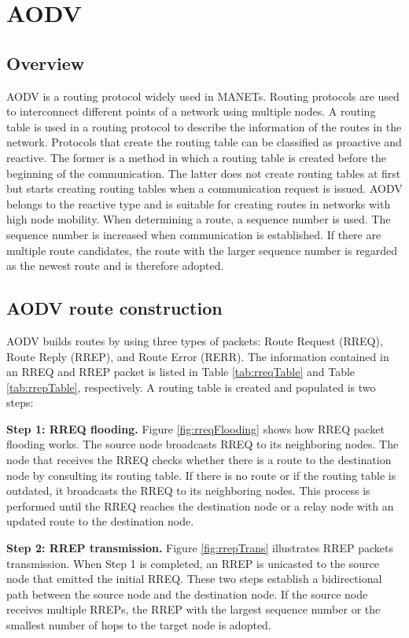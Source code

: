 \documentclass[conference]{IEEEtran}
\begin{document}
\section{AODV}
\label{aodvSection}
\subsection{Overview}
AODV \cite{2} is a routing protocol widely used in MANETs. Routing protocols are used to interconnect different points of a network using multiple nodes. A routing table is used in a routing protocol to describe the information of the routes in the network. Protocols that create the routing table can be classified as proactive and reactive. The former is a method in which a routing table is created before the beginning of the communication. The latter does not create routing tables at first but starts creating routing tables when a communication request is issued. AODV belongs to the reactive type and is suitable for creating routes in networks with high node mobility. When determining a route, a sequence number is used. The sequence number is increased when communication is established. If there are multiple route candidates, the route with the larger sequence number is regarded as the newest route and is therefore adopted.

\subsection{AODV route construction}
AODV builds routes by using three types of packets: Route Request (RREQ), Route Reply (RREP), and Route Error (RERR). The information contained in an RREQ and RREP packet is listed in Table \ref{tab:rreqTable} and Table \ref{tab:rrepTable}, respectively. A routing table is created and populated is two steps: 

\textbf{Step 1: RREQ flooding.} Figure \ref{fig:rreqFlooding} shows how RREQ packet flooding works. The source node broadcasts RREQ to its neighboring nodes. The node that receives the RREQ checks whether there is a route to the destination node by consulting its routing table. If there is no route or if the routing table is outdated, it broadcasts the RREQ to its neighboring nodes. This process is performed until the RREQ reaches the destination node or a relay node with an updated route to the destination node.

\textbf{Step 2:  RREP transmission.}  Figure \ref{fig:rrepTrans} illustrates RREP packets transmission. When Step 1 is completed, an RREP is unicasted to the source node that emitted the initial RREQ. These two steps establish a bidirectional path between the source node and the destination node. If the source node receives multiple RREPs, the RREP with the largest sequence number or the smallest number of hops to the target node is adopted.
\end{document}
